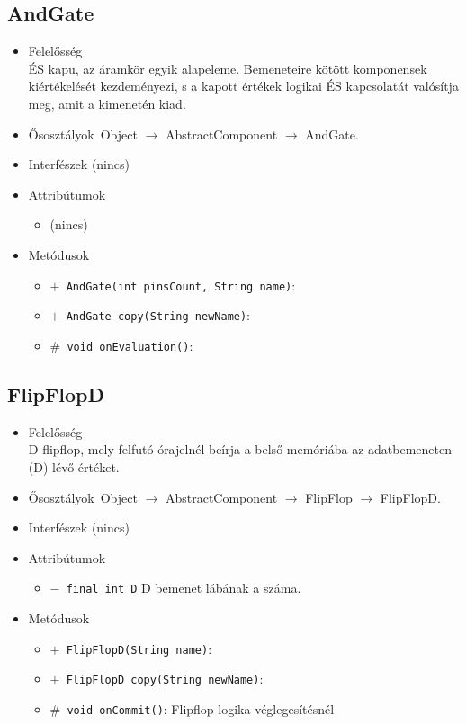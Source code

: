 \subsection{AndGate}
\begin{itemize}
\item Felelősség\\
ÉS kapu, az áramkör egyik alapeleme. Bemeneteire kötött komponensek  kiértékelését kezdeményezi, s a kapott értékek logikai ÉS kapcsolatát  valósítja meg, amit a kimenetén kiad.
\item Ősosztályok\ Object $\rightarrow{}$ AbstractComponent $\rightarrow{}$ AndGate.
\item Interfészek (nincs)
\item Attribútumok $\ $
\begin{itemize}
\item (nincs)
\end{itemize}
\item Metódusok$\ $
\begin{itemize}
	\item[] \texttt{$+$ AndGate(int pinsCount, String name)}: 
	\item[] \texttt{$+$ AndGate copy(String newName)}: 
	\item[] \texttt{$\#$ void onEvaluation()}: 
\end{itemize}
\end{itemize}

\subsection{FlipFlopD}
\begin{itemize}
\item Felelősség\\
D flipflop, mely felfutó órajelnél beírja a belső memóriába az adatbemeneten (D)  lévő értéket.
\item Ősosztályok\ Object $\rightarrow{}$ AbstractComponent $\rightarrow{}$ FlipFlop $\rightarrow{}$ FlipFlopD.
\item Interfészek (nincs)
\item Attribútumok $\ $
\begin{itemize}
	\item[] \texttt{$-$ final int \underline{D}} D bemenet lábának a száma.
\end{itemize}
\item Metódusok$\ $
\begin{itemize}
	\item[] \texttt{$+$ FlipFlopD(String name)}: 
	\item[] \texttt{$+$ FlipFlopD copy(String newName)}: 
	\item[] \texttt{$\#$ void onCommit()}: Flipflop logika véglegesítésnél
\end{itemize}
\end{itemize}

